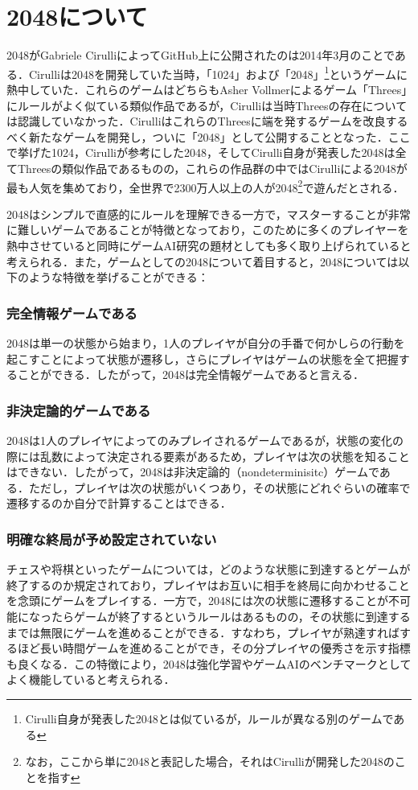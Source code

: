 \documentclass{suribt}
\begin{document}
\section{2048について}
2048がGabriele CirulliによってGitHub上に公開されたのは2014年3月のことである．Cirulliは2048を開発していた当時，「1024」および「2048」\footnote{Cirulli自身が発表した2048とは似ているが，ルールが異なる別のゲームである}というゲームに熱中していた．これらのゲームはどちらもAsher Vollmerによるゲーム「Threes」にルールがよく似ている類似作品であるが，Cirulliは当時Threesの存在については認識していなかった．CirulliはこれらのThreesに端を発するゲームを改良するべく新たなゲームを開発し，ついに「2048」として公開することとなった．ここで挙げた1024，Cirulliが参考にした2048，そしてCirulli自身が発表した2048は全てThreesの類似作品であるものの，これらの作品群の中ではCirulliによる2048が最も人気を集めており，全世界で2300万人以上の人が2048\footnote{なお，ここから単に2048と表記した場合，それはCirulliが開発した2048のことを指す}で遊んだとされる．

2048はシンプルで直感的にルールを理解できる一方で，マスターすることが非常に難しいゲームであることが特徴となっており，このために多くのプレイヤーを熱中させていると同時にゲームAI研究の題材としても多く取り上げられていると考えられる．また，ゲームとしての2048について着目すると，2048については以下のような特徴を挙げることができる：

\subsubsection{完全情報ゲームである}
2048は単一の状態から始まり，1人のプレイヤが自分の手番で何かしらの行動を起こすことによって状態が遷移し，さらにプレイヤはゲームの状態を全て把握することができる．したがって，2048は完全情報ゲームであると言える．

\subsubsection{非決定論的ゲームである}
2048は1人のプレイヤによってのみプレイされるゲームであるが，状態の変化の際には乱数によって決定される要素があるため，プレイヤは次の状態を知ることはできない．したがって，2048は非決定論的（nondeterminisitc）ゲームである．ただし，プレイヤは次の状態がいくつあり，その状態にどれぐらいの確率で遷移するのか自分で計算することはできる．

\subsubsection{明確な終局が予め設定されていない}
チェスや将棋といったゲームについては，どのような状態に到達するとゲームが終了するのか規定されており，プレイヤはお互いに相手を終局に向かわせることを念頭にゲームをプレイする．一方で，2048には次の状態に遷移することが不可能になったらゲームが終了するというルールはあるものの，その状態に到達するまでは無限にゲームを進めることができる．すなわち，プレイヤが熟達すればするほど長い時間ゲームを進めることができ，その分プレイヤの優秀さを示す指標も良くなる．この特徴により，2048は強化学習やゲームAIのベンチマークとしてよく機能していると考えられる．
\end{document}
